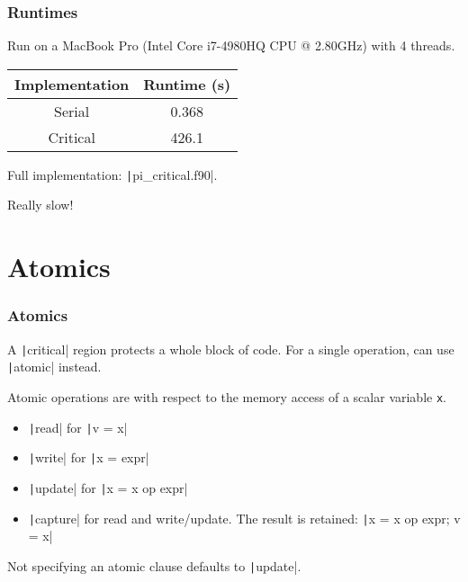 \documentclass{beamer}
\begin{document}
\begin{frame}
\frametitle{Runtimes}
Run on a MacBook Pro (Intel Core i7-4980HQ CPU @ 2.80GHz) with 4 threads.

\vfill

\begin{table}
\begin{tabular}{cc}
\toprule
Implementation & Runtime (s) \\
\midrule
Serial   & 0.368 \\
Critical & 426.1 \\
\bottomrule
\end{tabular}
\end{table}

Full implementation: \texttt|pi_critical.f90|.

\begin{center}
\large Really slow!
\end{center}

\end{frame}

\section{Atomics}
\begin{frame}[fragile]
\frametitle{Atomics}
A \texttt|critical| region protects a whole block of code. For a single operation, can use \texttt|atomic| instead.

Atomic operations are with respect to the memory access of a scalar variable {\tt x}.

\begin{itemize}
  \item \texttt|read| for \texttt|v = x|
  \item \texttt|write| for \texttt|x = expr|
  \item \texttt|update| for \texttt|x = x op expr|
  \item \texttt|capture| for read and write/update. The result is retained: \texttt|x = x op expr; v = x|
\end{itemize}

Not specifying an atomic clause defaults to \texttt|update|.
\end{frame}
\end{document}
